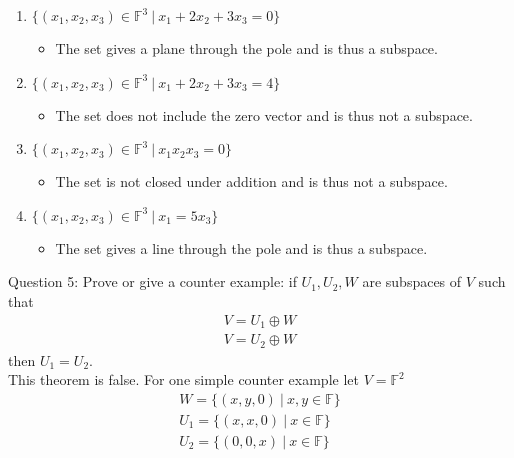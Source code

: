 \documentclass[11pt]{article}
\begin{document}
	\begin{enumerate}[label=(\alph*)]
		\item $\{(x_1,x_2,x_3)\in\mathbb{F}^3\:|\: x_1+2x_2+3x_3=0\}$
			\begin{itemize}[label=\textendash]
				\item The set gives a plane through the pole and is thus a subspace.
			\end{itemize}
		\item $\{(x_1,x_2,x_3)\in\mathbb{F}^3\:|\: x_1+2x_2+3x_3=4\}$
			\begin{itemize}[label=\textendash]
				\item The set does not include the zero vector and is thus not a subspace.
			\end{itemize}
		\item $\{(x_1,x_2,x_3)\in\mathbb{F}^3\:|\: x_1 x_2 x_3=0\}$
			\begin{itemize}[label=\textendash]
				\item The set is not closed under addition and is thus not a subspace.
			\end{itemize}
		\item $\{(x_1,x_2,x_3)\in\mathbb{F}^3\:|\: x_1 = 5x_3\}$
			\begin{itemize}[label=\textendash]
				\item The set gives a line through the pole and is thus a subspace.
			\end{itemize}
	\end{enumerate}

	\noindent Question 5: Prove or give a counter example: if $U_1,U_2,W$ are subspaces of $V$
						  such that 
						  \begin{gather*}
						      V=U_1\oplus W\\
						  	  V=U_2\oplus W
						  \end{gather*}
						  then $U_1=U_2$.\\

	This theorem is false. For one simple counter example let $V=\mathbb{F}^2$
	\begin{gather*}
		W=\{(x,y,0)\:| \:x,y\in\mathbb{F}\}\\
		U_1=\{(x,x,0)\:| \:x\in\mathbb{F}\}\\
		U_2=\{(0,0,x)\:| \:x\in\mathbb{F}\}
	\end{gather*}
\end{document}
